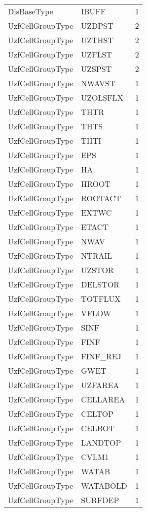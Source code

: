 \begin{longtable}{p{6cm} p{4cm} p{2cm} }
DisBaseType &  IBUFF & 1 \\ 
UzfCellGroupType &  UZDPST & 2 \\ 
UzfCellGroupType &  UZTHST & 2 \\ 
UzfCellGroupType &  UZFLST & 2 \\ 
UzfCellGroupType &  UZSPST & 2 \\ 
UzfCellGroupType &  NWAVST & 1 \\ 
UzfCellGroupType &  UZOLSFLX & 1 \\ 
UzfCellGroupType &  THTR & 1 \\ 
UzfCellGroupType &  THTS & 1 \\ 
UzfCellGroupType &  THTI & 1 \\ 
UzfCellGroupType &  EPS & 1 \\ 
UzfCellGroupType &  HA & 1 \\ 
UzfCellGroupType &  HROOT & 1 \\ 
UzfCellGroupType &  ROOTACT & 1 \\ 
UzfCellGroupType &  EXTWC & 1 \\ 
UzfCellGroupType &  ETACT & 1 \\ 
UzfCellGroupType &  NWAV & 1 \\ 
UzfCellGroupType &  NTRAIL & 1 \\ 
UzfCellGroupType &  UZSTOR & 1 \\ 
UzfCellGroupType &  DELSTOR & 1 \\ 
UzfCellGroupType &  TOTFLUX & 1 \\ 
UzfCellGroupType &  VFLOW & 1 \\ 
UzfCellGroupType &  SINF & 1 \\ 
UzfCellGroupType &  FINF & 1 \\ 
UzfCellGroupType &  FINF\_REJ & 1 \\ 
UzfCellGroupType &  GWET & 1 \\ 
UzfCellGroupType &  UZFAREA & 1 \\ 
UzfCellGroupType &  CELLAREA & 1 \\ 
UzfCellGroupType &  CELTOP & 1 \\ 
UzfCellGroupType &  CELBOT & 1 \\ 
UzfCellGroupType &  LANDTOP & 1 \\ 
UzfCellGroupType &  CVLM1 & 1 \\ 
UzfCellGroupType &  WATAB & 1 \\ 
UzfCellGroupType &  WATABOLD & 1 \\ 
UzfCellGroupType &  SURFDEP & 1 \\ 

\end{longtable}
